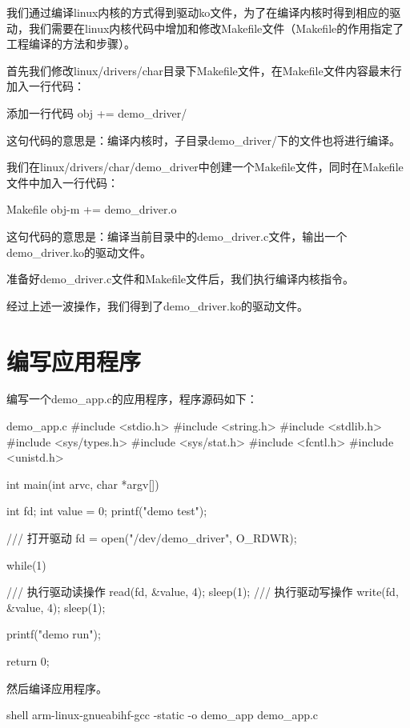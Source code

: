 \documentclass[lang=cn,newtx,10pt,scheme=chinese]{elegantbook}
\begin{document}
我们通过编译linux内核的方式得到驱动ko文件，为了在编译内核时得到相应的驱动，我们需要在linux内核代码中增加和修改Makefile文件（Makefile的作用指定了工程编译的方法和步骤）。

首先我们修改linux/drivers/char目录下Makefile文件，在Makefile文件内容最末行加入一行代码：

\begin{mycode}{添加一行代码}
obj += demo_driver/
\end{mycode}

这句代码的意思是：编译内核时，子目录demo\_driver/下的文件也将进行编译。

我们在linux/drivers/char/demo\_driver中创建一个Makefile文件，同时在Makefile文件中加入一行代码：

\begin{mycode}{Makefile}
obj-m += demo_driver.o
\end{mycode}

这句代码的意思是：编译当前目录中的demo\_driver.c文件，输出一个demo\_driver.ko的驱动文件。

准备好demo\_driver.c文件和Makefile文件后，我们执行编译内核指令。

经过上述一波操作，我们得到了demo\_driver.ko的驱动文件。

\section{编写应用程序}

编写一个demo\_app.c的应用程序，程序源码如下：

\begin{mycode}{demo\_app.c}
#include <stdio.h> 
#include <string.h> 
#include <stdlib.h>
#include <sys/types.h>
#include <sys/stat.h> 
#include <fcntl.h> 
#include <unistd.h>

int main(int arvc, char *argv[])
{
    int fd;
    int value = 0;
    printf("demo test\n");

    /// 打开驱动
    fd = open("/dev/demo_driver", O_RDWR);

    while(1)
    {
        /// 执行驱动读操作
        read(fd, &value, 4);
        sleep(1);
        /// 执行驱动写操作
        write(fd, &value, 4);
        sleep(1);    
        
        printf("demo run\n");
    }
    return 0;
}
\end{mycode}

然后编译应用程序。

\begin{mycode}{shell}
arm-linux-gnueabihf-gcc -static -o demo_app demo_app.c
\end{mycode}
\end{document}
